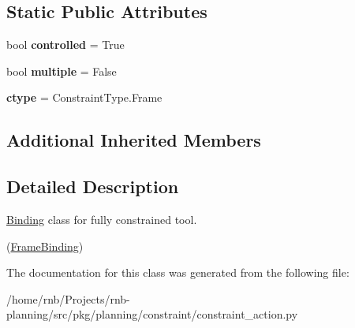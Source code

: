 \subsection*{Static Public Attributes}
\begin{DoxyCompactItemize}
\item 
\mbox{\label{classrnb-planning_1_1src_1_1pkg_1_1planning_1_1constraint_1_1constraint__action_1_1_framed_tool_aeae5a7884d94ce802cff43830df1700b}} 
bool {\bfseries controlled} = True
\item 
\mbox{\label{classrnb-planning_1_1src_1_1pkg_1_1planning_1_1constraint_1_1constraint__action_1_1_framed_tool_a7ba86c7509b81ce605bb36a948aa1fea}} 
bool {\bfseries multiple} = False
\item 
\mbox{\label{classrnb-planning_1_1src_1_1pkg_1_1planning_1_1constraint_1_1constraint__action_1_1_framed_tool_abc8857e997d6a17644a0dfe9f5affb19}} 
{\bfseries ctype} = Constraint\+Type.\+Frame
\end{DoxyCompactItemize}
\subsection*{Additional Inherited Members}


\subsection{Detailed Description}
\hyperlink{classrnb-planning_1_1src_1_1pkg_1_1planning_1_1constraint_1_1constraint__action_1_1_binding}{Binding} class for fully constrained tool. 

(\hyperlink{classrnb-planning_1_1src_1_1pkg_1_1planning_1_1constraint_1_1constraint__action_1_1_frame_binding}{Frame\+Binding}) 

The documentation for this class was generated from the following file\+:\begin{DoxyCompactItemize}
\item 
/home/rnb/\+Projects/rnb-\/planning/src/pkg/planning/constraint/constraint\+\_\+action.\+py\end{DoxyCompactItemize}
